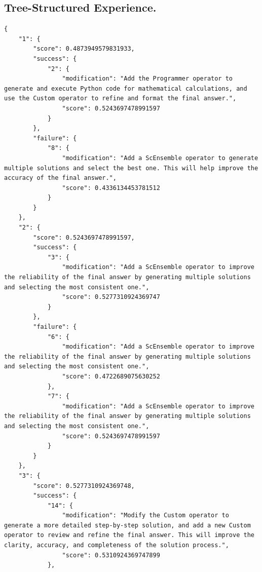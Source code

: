 \documentclass{article} %
\theoremstyle{plain}
\theoremstyle{definition}
\theoremstyle{remark}
\begin{document}
\subsection{Tree-Structured Experience.}
\begin{tcolorbox}[title={\textbf{\small Processed Experience (formatted as tree sturcture)}}, boxrule=1pt, arc=0mm, colback=black!5!white, colframe=black!75!white, breakable, before skip=10pt, after skip=10pt, pad at break=2mm, parbox=false] \begin{verbatim}
{
    "1": {
        "score": 0.4873949579831933,
        "success": {
            "2": {
                "modification": "Add the Programmer operator to generate and execute Python code for mathematical calculations, and use the Custom operator to refine and format the final answer.",
                "score": 0.5243697478991597
            }
        },
        "failure": {
            "8": {
                "modification": "Add a ScEnsemble operator to generate multiple solutions and select the best one. This will help improve the accuracy of the final answer.",
                "score": 0.4336134453781512
            }
        }
    },
    "2": {
        "score": 0.5243697478991597,
        "success": {
            "3": {
                "modification": "Add a ScEnsemble operator to improve the reliability of the final answer by generating multiple solutions and selecting the most consistent one.",
                "score": 0.5277310924369747
            }
        },
        "failure": {
            "6": {
                "modification": "Add a ScEnsemble operator to improve the reliability of the final answer by generating multiple solutions and selecting the most consistent one.",
                "score": 0.4722689075630252
            },
            "7": {
                "modification": "Add a ScEnsemble operator to improve the reliability of the final answer by generating multiple solutions and selecting the most consistent one.",
                "score": 0.5243697478991597
            }
        }
    },
    "3": {
        "score": 0.5277310924369748,
        "success": {
            "14": {
                "modification": "Modify the Custom operator to generate a more detailed step-by-step solution, and add a new Custom operator to review and refine the final answer. This will improve the clarity, accuracy, and completeness of the solution process.",
                "score": 0.5310924369747899
            },

\end{verbatim}
\end{tcolorbox}
\end{document}
